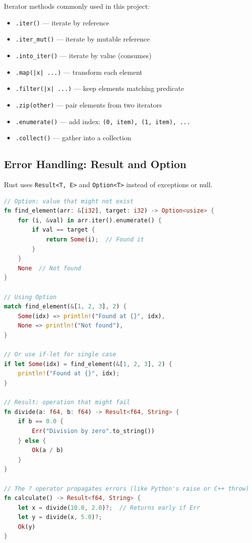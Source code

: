 \documentclass[11pt,a4paper]{article}
\begin{document}
Iterator methods commonly used in this project:
\begin{itemize}
    \item \texttt{.iter()} — iterate by reference
    \item \texttt{.iter\_mut()} — iterate by mutable reference  
    \item \texttt{.into\_iter()} — iterate by value (consumes)
    \item \texttt{.map(|x| ...)} — transform each element
    \item \texttt{.filter(|x| ...)} — keep elements matching predicate
    \item \texttt{.zip(other)} — pair elements from two iterators
    \item \texttt{.enumerate()} — add index: \texttt{(0, item), (1, item), ...}
    \item \texttt{.collect()} — gather into a collection
\end{itemize}

\subsection{Error Handling: Result and Option}

Rust uses \texttt{Result<T, E>} and \texttt{Option<T>} instead of exceptions or null.

\begin{lstlisting}[language=Rust]
// Option: value that might not exist
fn find_element(arr: &[i32], target: i32) -> Option<usize> {
    for (i, &val) in arr.iter().enumerate() {
        if val == target {
            return Some(i);  // Found it
        }
    }
    None  // Not found
}

// Using Option
match find_element(&[1, 2, 3], 2) {
    Some(idx) => println!("Found at {}", idx),
    None => println!("Not found"),
}

// Or use if-let for single case
if let Some(idx) = find_element(&[1, 2, 3], 2) {
    println!("Found at {}", idx);
}

// Result: operation that might fail
fn divide(a: f64, b: f64) -> Result<f64, String> {
    if b == 0.0 {
        Err("Division by zero".to_string())
    } else {
        Ok(a / b)
    }
}

// The ? operator propagates errors (like Python's raise or C++ throw)
fn calculate() -> Result<f64, String> {
    let x = divide(10.0, 2.0)?;  // Returns early if Err
    let y = divide(x, 5.0)?;
    Ok(y)
}
\end{lstlisting}
\end{document}
